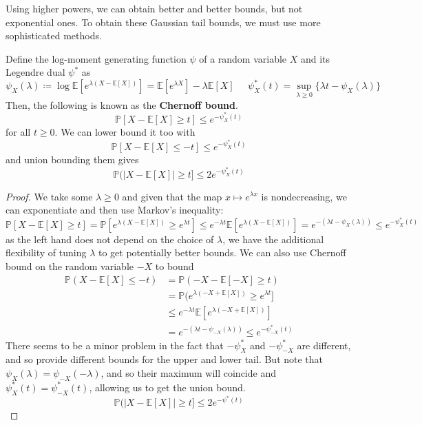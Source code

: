 \documentclass{article}
\begin{document}
  Using higher powers, we can obtain better and better bounds, but not exponential ones. To obtain these Gaussian tail bounds, we must use more sophisticated methods. 

  \begin{lemma}
  Define the log-moment generating function $\psi$ of a random variable $X$ and its Legendre dual $\psi^*$ as 
  \[\psi_X (\lambda) \coloneqq \log \mathbb{E}[ e^{\lambda (X - \mathbb{E}[X])} ] = \mathbb{E}[ e^{\lambda X} ] - \lambda \mathbb{E}[X] \;\;\;\;\; \psi_X^* (t) = \sup_{\lambda \geq 0} \{ \lambda t - \psi_X(\lambda)\}\]
  Then, the following is known as the \textbf{Chernoff bound}. 
  \[\mathbb{P}[X - \mathbb{E}[X] \geq t] \leq e^{-\psi_X^* (t)}\]
  for all $t \geq 0$. We can lower bound it too with 
  \[\mathbb{P}[X - \mathbb{E}[X] \leq -t] \leq e^{-\psi_X^* (t)}\]
  and union bounding them gives 
  \[\mathbb{P}(|X - \mathbb{E}[X] | \geq t ] \leq 2e^{- \psi_X^* (t)}\]
  \end{lemma}
  \begin{proof}
  We take some $\lambda \geq 0$ and given that the map $x \mapsto e^{\lambda x}$ is nondecreasing, we can exponentiate and then use Markov's inequality: 
  \[\mathbb{P}[X - \mathbb{E}[X] \geq t ] = \mathbb{P}[ e^{\lambda(X - \mathbb{E}[X])} \geq e^{\lambda t}] \leq e^{-\lambda t} \mathbb{E}[e^{\lambda (X - \mathbb{E}[X])}] = e^{- (\lambda t - \psi_X (\lambda))} \leq e^{-\psi_X^* (t)}\]
  as the left hand does not depend on the choice of $\lambda$, we have the additional flexibility of tuning $\lambda$ to get potentially better bounds. We can also use Chernoff bound on the random variable $-X$ to bound \begin{align*}
      \mathbb{P}(X - \mathbb{E}[X] \leq -t) & = \mathbb{P}(-X - \mathbb{E}[-X] \geq t) \\
      & = \mathbb{P}(e^{\lambda(-X + \mathbb{E}[X])} \geq e^{\lambda t} ] \\
      & \leq e^{-\lambda t} \mathbb{E}[ e^{\lambda (-X + \mathbb{E}[X])}] \\
      & = e^{-(\lambda t - \psi_{-X}(\lambda))} \leq e^{-\psi_{-X}^* (t)} 
  \end{align*}
  There seems to be a minor problem in the fact that $-\psi^*_X$ and $-\psi^*_{-X}$ are different, and so provide different bounds for the upper and lower tail. But note that $\psi_X (\lambda) = \psi_{-X}(-\lambda)$, and so their maximum will coincide and $\psi_X^* (t) = \psi_{-X}^* (t)$, allowing us to get the union bound. 
  \[\mathbb{P}(|X - \mathbb{E}[X] | \geq t ] \leq 2e^{- \psi^* (t)}\]
  \end{proof}
\end{document}
